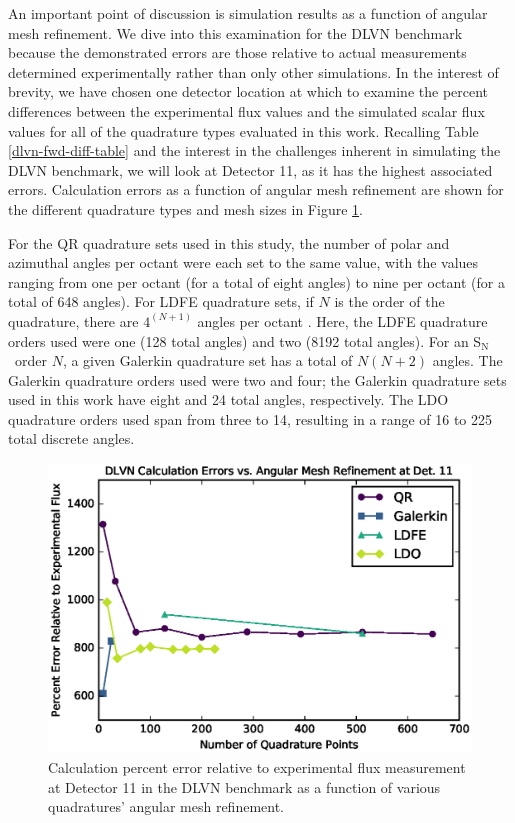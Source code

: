 \documentclass{article} %
\newcommand{\sn}{S$_\mathrm{N}$}
\begin{document}
An important point of discussion is simulation results as a function of
angular mesh refinement. We dive into this examination for the DLVN benchmark
because the demonstrated errors are those relative to actual measurements
determined experimentally rather than only other simulations. In the interest
of brevity, we have chosen one detector location at which to examine the
percent differences between the experimental flux values and the simulated
scalar flux values for all of the quadrature types evaluated in this work.
Recalling Table \ref{dlvn-fwd-diff-table} and the interest in the challenges
inherent in simulating the DLVN benchmark, we will look at Detector 11, as it
has the highest associated errors. Calculation errors as a function of angular
mesh refinement are shown for the different quadrature types and mesh sizes in
Figure \ref{dlvn-scale-all}.

For the QR quadrature sets used in this study, the number of polar and
azimuthal angles per octant were each set to the same value, with the values
ranging from one per octant (for a total of eight angles) to nine per octant
(for a total of 648 angles). For LDFE quadrature sets, if $N$ is the order of
the quadrature, there are $4^{(N+1)}$ angles per octant \cite{exum}. Here, the
LDFE quadrature orders used were one (128 total angles) and two (8192 total
angles). For an \sn\ order $N$, a given Galerkin quadrature set has a total of
$N(N+2)$ angles. The Galerkin quadrature orders used were two and four; the
Galerkin quadrature sets used in this work have eight and 24 total angles,
respectively. The LDO quadrature orders used span from three to 14, resulting
in a range of 16 to 225 total discrete angles.

\begin{figure}[!htb]
\centering
\includegraphics{dlvn-error-scale-11.eps}
\caption{Calculation percent error relative to experimental flux 
         measurement at Detector 11 in the DLVN benchmark as a function of 
         various quadratures' angular mesh refinement.}
\label{dlvn-scale-all}
\end{figure}
\end{document}
